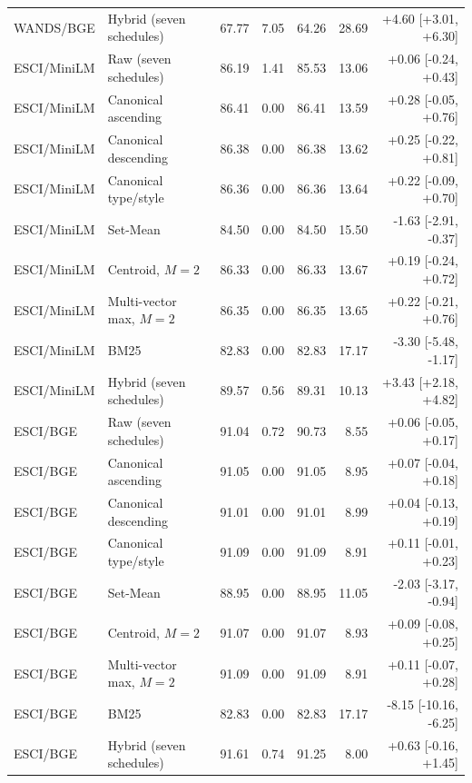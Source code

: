 \begin{table}[t]
\begin{tabular}{llrrrrr}
WANDS/BGE & Hybrid (seven schedules) & 67.77 & 7.05 & 64.26 & 28.69 & +4.60 [+3.01, +6.30] \\
ESCI/MiniLM & Raw (seven schedules) & 86.19 & 1.41 & 85.53 & 13.06 & +0.06 [-0.24, +0.43] \\
ESCI/MiniLM & Canonical ascending & 86.41 & 0.00 & 86.41 & 13.59 & +0.28 [-0.05, +0.76] \\
ESCI/MiniLM & Canonical descending & 86.38 & 0.00 & 86.38 & 13.62 & +0.25 [-0.22, +0.81] \\
ESCI/MiniLM & Canonical type/style & 86.36 & 0.00 & 86.36 & 13.64 & +0.22 [-0.09, +0.70] \\
ESCI/MiniLM & Set-Mean & 84.50 & 0.00 & 84.50 & 15.50 & -1.63 [-2.91, -0.37] \\
ESCI/MiniLM & Centroid, $M=2$ & 86.33 & 0.00 & 86.33 & 13.67 & +0.19 [-0.24, +0.72] \\
ESCI/MiniLM & Multi-vector max, $M=2$ & 86.35 & 0.00 & 86.35 & 13.65 & +0.22 [-0.21, +0.76] \\
ESCI/MiniLM & BM25 & 82.83 & 0.00 & 82.83 & 17.17 & -3.30 [-5.48, -1.17] \\
ESCI/MiniLM & Hybrid (seven schedules) & 89.57 & 0.56 & 89.31 & 10.13 & +3.43 [+2.18, +4.82] \\
ESCI/BGE & Raw (seven schedules) & 91.04 & 0.72 & 90.73 & 8.55 & +0.06 [-0.05, +0.17] \\
ESCI/BGE & Canonical ascending & 91.05 & 0.00 & 91.05 & 8.95 & +0.07 [-0.04, +0.18] \\
ESCI/BGE & Canonical descending & 91.01 & 0.00 & 91.01 & 8.99 & +0.04 [-0.13, +0.19] \\
ESCI/BGE & Canonical type/style & 91.09 & 0.00 & 91.09 & 8.91 & +0.11 [-0.01, +0.23] \\
ESCI/BGE & Set-Mean & 88.95 & 0.00 & 88.95 & 11.05 & -2.03 [-3.17, -0.94] \\
ESCI/BGE & Centroid, $M=2$ & 91.07 & 0.00 & 91.07 & 8.93 & +0.09 [-0.08, +0.25] \\
ESCI/BGE & Multi-vector max, $M=2$ & 91.09 & 0.00 & 91.09 & 8.91 & +0.11 [-0.07, +0.28] \\
ESCI/BGE & BM25 & 82.83 & 0.00 & 82.83 & 17.17 & -8.15 [-10.16, -6.25] \\
ESCI/BGE & Hybrid (seven schedules) & 91.61 & 0.74 & 91.25 & 8.00 & +0.63 [-0.16, +1.45] \\
\bottomrule
\end{tabular}
\end{table}
